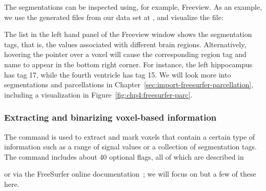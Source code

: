 The segmentations can be inspected using, for example, Freeview. As an
example, we use the \freesurfer{} generated files from our data set at
, and visualize the  file:

\noindent The list in the left hand panel of the Freeview window shows
the segmentation tags, that is, the values associated with different brain
regions. Alternatively, hovering the pointer over a voxel will
cause the corresponding region tag and name to appear in the bottom
right corner. For instance, the left hippocampus has tag 17, while the
fourth ventricle has tag 15. We will look more into segmentations and
parcellations in Chapter~\ref{sec:import-freesurfer-parcellation},
including a visualization in Figure~\ref{fig:chp4:freesurfer-parc}.

\subsubsection*{Extracting and binarizing voxel-based information}
The {\freesurfer} command  is used to extract and
mark voxels that contain a certain type of information such as a range
of signal values or a collection of segmentation tags. The command
includes about 40 optional flags, all of which are described in

\noindent or via the FreeSurfer online
documentation~\cite{freesurfer-wiki}; we will focus on but a few of
these here.

